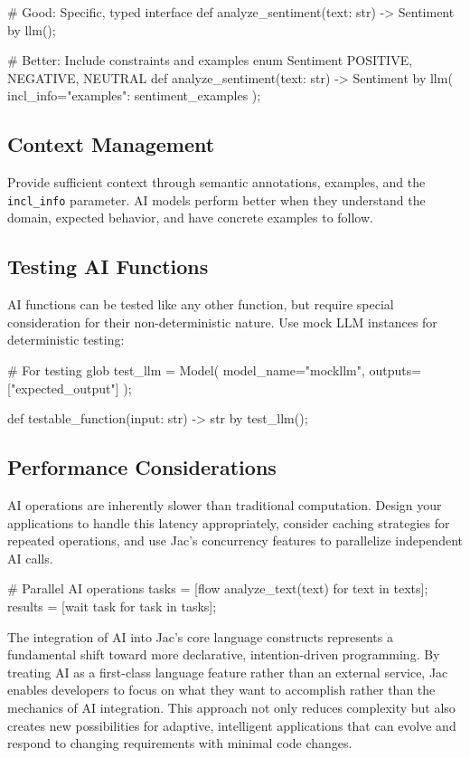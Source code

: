 \begin{jacblock}
# Good: Specific, typed interface
def analyze_sentiment(text: str) -> Sentiment by llm();

# Better: Include constraints and examples
enum Sentiment { POSITIVE, NEGATIVE, NEUTRAL }
def analyze_sentiment(text: str) -> Sentiment by llm(
    incl_info={"examples": sentiment_examples}
);
\end{jacblock}

\subsection{Context Management}

Provide sufficient context through semantic annotations, examples, and the \texttt{incl\_info} parameter. AI models perform better when they understand the domain, expected behavior, and have concrete examples to follow.

\subsection{Testing AI Functions}

AI functions can be tested like any other function, but require special consideration for their non-deterministic nature. Use mock LLM instances for deterministic testing:

\begin{jacblock}
# For testing
glob test_llm = Model(
    model_name="mockllm",
    outputs=["expected_output"]
);

def testable_function(input: str) -> str by test_llm();
\end{jacblock}

\subsection{Performance Considerations}

AI operations are inherently slower than traditional computation. Design your applications to handle this latency appropriately, consider caching strategies for repeated operations, and use Jac's concurrency features to parallelize independent AI calls.

\begin{jacblock}
# Parallel AI operations
tasks = [flow analyze_text(text) for text in texts];
results = [wait task for task in tasks];
\end{jacblock}

The integration of AI into Jac's core language constructs represents a fundamental shift toward more declarative, intention-driven programming. By treating AI as a first-class language feature rather than an external service, Jac enables developers to focus on what they want to accomplish rather than the mechanics of AI integration. This approach not only reduces complexity but also creates new possibilities for adaptive, intelligent applications that can evolve and respond to changing requirements with minimal code changes.

